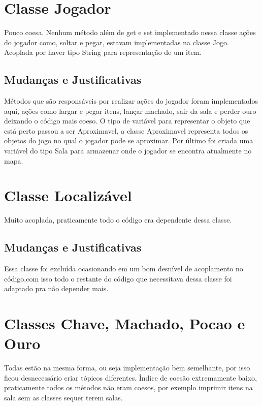 \documentclass[runningheads,a4paper]{llncs}
\begin{document}
\section{Classe Jogador}

Pouco coesa. Nenhum método além de get e set implementado nessa classe ações do jogador como, soltar e pegar, estavam implementadas na classe Jogo. Acoplada por haver tipo String para representação de um item.

\subsection{Mudanças e Justificativas}

Métodos que são responsáveis por realizar ações do jogador foram implementados aqui, ações como largar e pegar itens, lançar machado, sair da sala e perder ouro deixando o código mais coeso. O tipo de variável para representar o objeto que está perto passou a ser Aproximavel, a classe Aproximavel representa todos os objetos do jogo no qual o jogador pode se aproximar. Por último foi criada uma variável do tipo Sala para armazenar onde o jogador se encontra atualmente no mapa. 

\section{Classe Localizável}

Muito acoplada, praticamente todo o código era dependente dessa classe.

\subsection{Mudanças e Justificativas}

Essa classe foi excluída ocasionando em um bom desnível de acoplamento no código,com isso todo o restante do código que necessitava dessa classe foi adaptado pra não depender mais. 

\section{Classes Chave, Machado, Pocao e Ouro}

Todas estão na mesma forma, ou seja implementação bem semelhante, por isso ficou desnecessário criar tópicos diferentes.
Índice de coesão extremamente baixo, praticamente todos os métodos não eram coesos, por exemplo imprimir itens na sala sem as classes sequer terem salas. 
\end{document}

